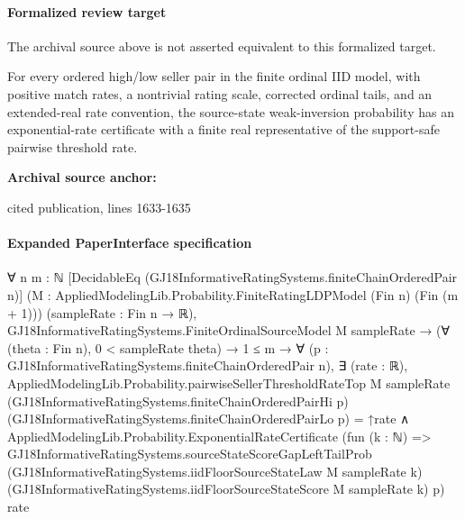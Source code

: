 \documentclass[10pt]{article}
\begin{document}


\paragraph{Formalized review target}
The archival source above is not asserted equivalent to this formalized target.
\begin{ReviewVerbatim}
For every ordered high/low seller pair in the finite ordinal IID model, with positive match rates, a nontrivial rating scale, corrected ordinal tails, and an extended-real rate convention, the source-state weak-inversion probability has an exponential-rate certificate with a finite real representative of the support-safe pairwise threshold rate.
\end{ReviewVerbatim}

\textbf{Archival source anchor:} {\footnotesize\raggedright cited publication, lines 1633-\allowbreak{}1635\par}
\paragraph{Expanded PaperInterface specification}
\begin{ReviewVerbatim}
∀ {n m : ℕ} [DecidableEq (GJ18InformativeRatingSystems.finiteChainOrderedPair n)]
  (M : AppliedModelingLib.Probability.FiniteRatingLDPModel (Fin n) (Fin (m + 1))) (sampleRate : Fin n → ℝ),
  GJ18InformativeRatingSystems.FiniteOrdinalSourceModel M sampleRate →
    (∀ (theta : Fin n), 0 < sampleRate theta) →
      1 ≤ m →
        ∀ (p : GJ18InformativeRatingSystems.finiteChainOrderedPair n),
          ∃ (rate : ℝ),
            AppliedModelingLib.Probability.pairwiseSellerThresholdRateTop M sampleRate
                  (GJ18InformativeRatingSystems.finiteChainOrderedPairHi p)
                  (GJ18InformativeRatingSystems.finiteChainOrderedPairLo p) =
                ↑rate ∧
              AppliedModelingLib.Probability.ExponentialRateCertificate
                (fun (k : ℕ) =>
                  GJ18InformativeRatingSystems.sourceStateScoreGapLeftTailProb
                    (GJ18InformativeRatingSystems.iidFloorSourceStateLaw M sampleRate k)
                    (GJ18InformativeRatingSystems.iidFloorSourceStateScore M sampleRate k) p)
                rate
\end{ReviewVerbatim}
\end{document}
